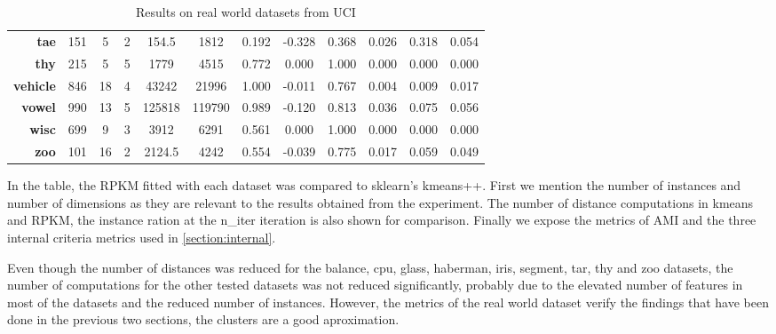\begin{table}[ht!]
{\begin{tabular}{|r|ccccccccccc|}
    \textbf{tae}           & 151                 & 5               & 2                & 154.5               & 1812                & 0.192                    & -0.328            & 0.368        & 0.026               & 0.318               & 0.054               \\
    \textbf{thy}           & 215                 & 5               & 5                & 1779                & 4515                & 0.772                    & 0.000             & 1.000        & 0.000               & 0.000               & 0.000               \\
    \textbf{vehicle}       & 846                 & 18              & 4                & 43242               & 21996               & 1.000                    & -0.011            & 0.767        & 0.004               & 0.009               & 0.017               \\
    \textbf{vowel}         & 990                 & 13              & 5                & 125818              & 119790              & 0.989                    & -0.120            & 0.813        & 0.036               & 0.075               & 0.056               \\
    \textbf{wisc}          & 699                 & 9               & 3                & 3912                & 6291                & 0.561                    & 0.000             & 1.000        & 0.000               & 0.000               & 0.000               \\
    \textbf{zoo}           & 101                 & 16              & 2                & 2124.5              & 4242                & 0.554                    & -0.039            & 0.775        & 0.017               & 0.059               & 0.049               \\ \hline
    \end{tabular}}
    \caption{Results on real world datasets from UCI}
    \label{table:real}
\end{table}

In the table, the RPKM fitted with each dataset was compared to sklearn's kmeans++. First we mention the number of instances and number of dimensions as they are relevant to the results obtained from the experiment. The number of distance computations in kmeans and RPKM, the instance ration at the n\_iter iteration is also shown for comparison. Finally we expose the metrics of AMI and the three internal criteria metrics used in \ref{section:internal}. 

Even though the number of distances was reduced for the balance, cpu, glass, haberman, iris, segment, tar, thy and zoo datasets, the number of computations for the other tested datasets was not reduced significantly, probably due to the elevated number of features in most of the datasets and the reduced number of instances. However, the metrics of the real world dataset verify the findings that have been done in the previous two sections, the clusters are a good aproximation.
